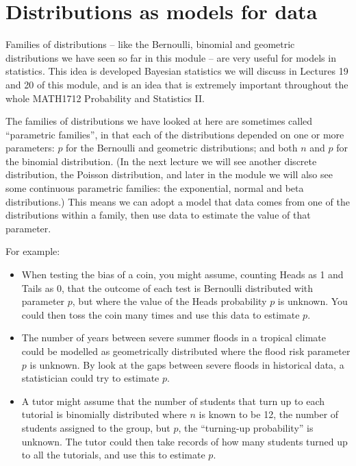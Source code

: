 \documentclass[
  letterpaper,
]{report}
\providecommand{\tightlist}{%
  \setlength{\itemsep}{0pt}\setlength{\parskip}{0pt}}\usepackage{longtable,booktabs,array}
\theoremstyle{definition}
\theoremstyle{definition}
\theoremstyle{remark}
\begin{document}
\hypertarget{models}{%
\section{Distributions as models for data}\label{models}}

Families of distributions -- like the Bernoulli, binomial and geometric
distributions we have seen so far in this module -- are very useful for
models in statistics. This idea is developed Bayesian statistics we will
discuss in Lectures 19 and 20 of this module, and is an idea that is
extremely important throughout the whole MATH1712 Probability and
Statistics II.

The families of distributions we have looked at here are sometimes
called ``parametric families'', in that each of the distributions
depended on one or more parameters: \(p\) for the Bernoulli and
geometric distributions; and both \(n\) and \(p\) for the binomial
distribution. (In the next lecture we will see another discrete
distribution, the Poisson distribution, and later in the module we will
also see some continuous parametric families: the exponential, normal
and beta distributions.) This means we can adopt a model that data comes
from one of the distributions within a family, then use data to estimate
the value of that parameter.

For example:

\begin{itemize}
\tightlist
\item
  When testing the bias of a coin, you might assume, counting Heads as 1
  and Tails as 0, that the outcome of each test is Bernoulli distributed
  with parameter \(p\), but where the value of the Heads probability
  \(p\) is unknown. You could then toss the coin many times and use this
  data to estimate \(p\).
\item
  The number of years between severe summer floods in a tropical climate
  could be modelled as geometrically distributed where the flood risk
  parameter \(p\) is unknown. By look at the gaps between severe floods
  in historical data, a statistician could try to estimate \(p\).
\item
  A tutor might assume that the number of students that turn up to each
  tutorial is binomially distributed where \(n\) is known to be 12, the
  number of students assigned to the group, but \(p\), the ``turning-up
  probability'' is unknown. The tutor could then take records of how
  many students turned up to all the tutorials, and use this to estimate
  \(p\).
\end{itemize}
\end{document}
